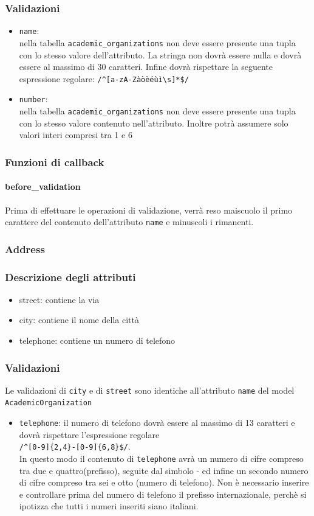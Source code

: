 \documentclass[11pt,a4paper]{article}
\begin{document}
\subsubsection*{Validazioni}
\begin{itemize}
 \item \verb|name|:\\ nella tabella \verb|academic_organizations| non deve essere presente una tupla con lo stesso valore dell'attributo. La stringa non dovrà essere nulla e dovrà essere al massimo di 30 caratteri. Infine dovrà rispettare la seguente espressione regolare: \verb|/^[a-zA-Zàòèéùì\s]*$/|
\item \verb|number|:\\ nella tabella \verb|academic_organizations| non deve essere presente una tupla con lo stesso valore contenuto nell'attributo. Inoltre potrà assumere solo valori interi compresi tra 1 e 6
\end{itemize}
\subsubsection*{Funzioni di callback}
\paragraph{before\_validation}
Prima di effettuare le operazioni di validazione, verrà reso maiscuolo il primo carattere del contenuto dell'attributo \verb|name| e minuscoli i rimanenti.
\subsubsection{Address}
\subsubsection*{Descrizione degli attributi}
\begin{itemize}
 \item street: contiene la via  
 \item city: contiene il nome della città
 \item telephone: contiene un numero di telefono
\end{itemize}
\subsubsection*{Validazioni}
Le validazioni di \verb|city| e di \verb|street| sono identiche all'attributo \verb|name| del model \verb|AcademicOrganization|
\begin{itemize}
 \item \verb|telephone|: il numero di telefono dovrà essere al massimo di 13 caratteri e dovrà rispettare l'espressione regolare\\
 \verb|/^[0-9]{2,4}-[0-9]{6,8}$/|.\\  
In questo modo il contenuto di \verb|telephone| avrà un numero di cifre compreso tra due e quattro(prefisso), seguite dal simbolo - ed infine un secondo numero di cifre compreso tra sei e otto (numero di telefono). Non è necessario inserire e controllare prima del numero di telefono il prefisso internazionale, perchè si ipotizza che tutti i numeri inseriti siano italiani.
\end{itemize}
\end{document}
